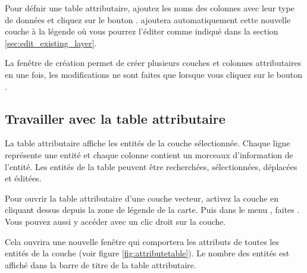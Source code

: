 Pour défnir une table attributaire, ajoutez les noms des colonnes avec leur type 
de données et cliquez sur le bouton . \qg ajoutera automatiquement 
cette nouvelle couche à la légende où vous pourrez l'éditer comme indiqué dans 
la section \ref{sec:edit_existing_layer}.

La fenêtre de création permet de créer plusieurs couches et colonnes attributaires 
en une fois, les modifications ne sont faites que lorsque vous cliquez sur le 
bouton .

\subsection{Travailler avec la table attributaire}\label{sec:attribute table}

La table attributaire affiche les entités de la couche sélectionnée. Chaque 
ligne représente une entité et chaque colonne contient un morceaux d'information 
de l'entité. Les entités de la table peuvent être recherchées, sélectionnées, 
déplacées et éditées.

Pour ouvrir la table attributaire d'une couche vecteur, activez la couche en 
cliquant dessus depuis la zone de légende de la carte. Puis dans le menu 
, faites . Vous pouvez aussi y accéder avec un clic droit sur la couche.

Cela 
ouvrira une nouvelle fenêtre qui comportera les attributs de toutes les entités 
de la couche (voir figure \ref{fig:attributetable}). Le nombre des entités est 
affiché dans la barre de titre de la table attributaire.

